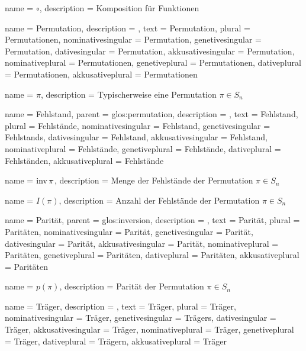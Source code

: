 {
    name        = {$\circ$},
    description = {Komposition für Funktionen}
}

{
    name               = {Permutation},
    description        = {},
    text               = {Permutation},
    plural             = {Permutationen},
    nominativesingular = {Permutation},
    genetivesingular   = {Permutation},
    dativesingular     = {Permutation},
    akkusativesingular = {Permutation},
    nominativeplural   = {Permutationen},
    genetiveplural     = {Permutationen},
    dativeplural       = {Permutationen},
    akkusativeplural   = {Permutationen}
}

{
    name        = {$\pi$},
    description = {Typischerweise eine Permutation $\pi \in S_n$}
}

{
    name               = {Fehlstand},
    parent             = {glos:permutation},
    description        = {},
    text               = {Fehlstand},
    plural             = {Fehlstände},
    nominativesingular = {Fehlstand},
    genetivesingular   = {Fehlstands},
    dativesingular     = {Fehlstand},
    akkusativesingular = {Fehlstand},
    nominativeplural   = {Fehlstände},
    genetiveplural     = {Fehlstände},
    dativeplural       = {Fehlständen},
    akkusativeplural   = {Fehlstände}
}

{
    name        = {$\operatorname{inv} \pi$},
    description = {Menge der Fehlstände der Permutation $\pi \in S_n$}
}

{
    name        = {$I(\pi)$},
    description = {Anzahl der Fehlstände der Permutation $\pi \in S_n$}
}

{
    name               = {Parität},
    parent             = {glos:inversion},
    description        = {},
    text               = {Parität},
    plural             = {Paritäten},
    nominativesingular = {Parität},
    genetivesingular   = {Parität},
    dativesingular     = {Parität},
    akkusativesingular = {Parität},
    nominativeplural   = {Paritäten},
    genetiveplural     = {Paritäten},
    dativeplural       = {Paritäten},
    akkusativeplural   = {Paritäten}
}

{
    name        = {$p(\pi)$},
    description = {Parität der Permutation $\pi \in S_n$}
}

{
    name               = {Träger},
    description        = {},
    text               = {Träger},
    plural             = {Träger},
    nominativesingular = {Träger},
    genetivesingular   = {Trägers},
    dativesingular     = {Träger},
    akkusativesingular = {Träger},
    nominativeplural   = {Träger},
    genetiveplural     = {Träger},
    dativeplural       = {Trägern},
    akkusativeplural   = {Träger}
}

